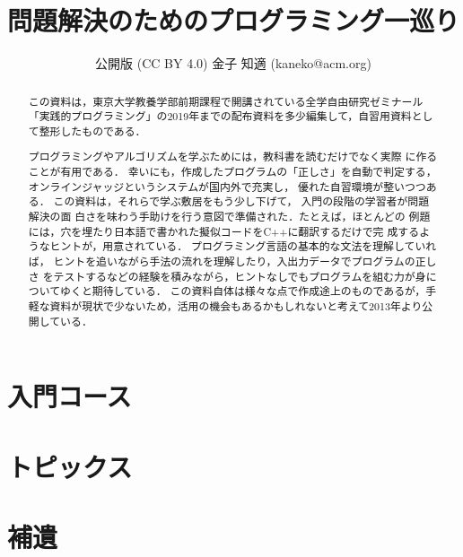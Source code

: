 \documentclass[dvipdfmx,report]{jsbook}
\title{問題解決のためのプログラミング一巡り}
\author{公開版 (CC BY 4.0) 金子 知適 (kaneko@acm.org)}
\date{}
\begin{document}
\maketitle

\begin{versionoutside}
 
\begin{abstract}
この資料は，東京大学教養学部前期課程で開講されている全学自由研究ゼミナール「実践的プログラミング」の2019年までの配布資料を多少編集して，自習用資料として整形したものである．

プログラミングやアルゴリズムを学ぶためには，教科書を読むだけでなく実際
に作ることが有用である．
幸いにも，作成したプログラムの「正しさ」を自動で判定する，
オンラインジャッジというシステムが国内外で充実し，
優れた自習環境が整いつつある．
この資料は，それらで学ぶ敷居をもう少し下げて，
入門の段階の学習者が問題解決の面
白さを味わう手助けを行う意図で準備された．たとえば，ほとんどの
例題には，穴を埋たり日本語で書かれた擬似コードをC++に翻訳するだけで完
成するようなヒントが，用意されている．
プログラミング言語の基本的な文法を理解していれば，
ヒントを追いながら手法の流れを理解したり，入出力データでプログラムの正しさ
をテストするなどの経験を積みながら，ヒントなしでもプログラムを組む力が身についてゆくと期待している．
この資料自体は様々な点で作成途上のものであるが，手軽な資料が現状で少ないため，活用の機会もあるかもしれないと考えて2013年より公開している．
\end{abstract}
\end{versionoutside}


\tableofcontents



\part{入門コース}




\part{トピックス}



\part{補遺}
\end{document}
